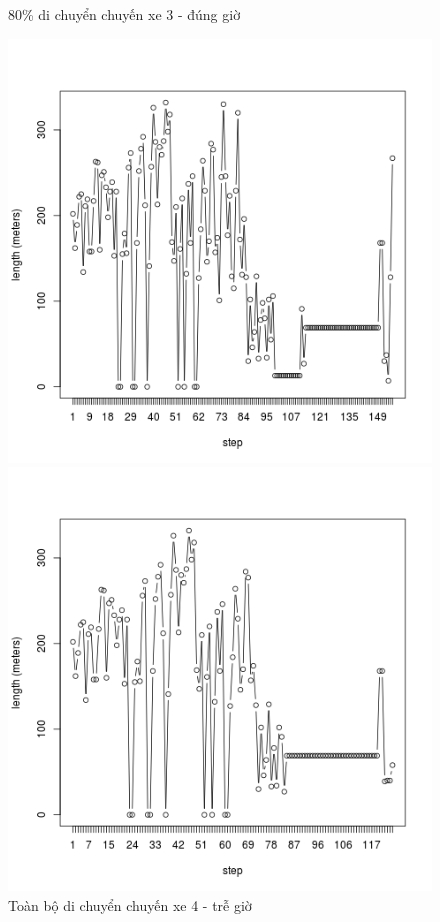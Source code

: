 \documentclass[a4paper, 13pt]{report}
\begin{document}
\begin{figure}[!htb]
  \caption*{80\% di chuyển chuyến xe 3 - đúng giờ}
\endminipage
{}%
  \includegraphics[width=\linewidth]{test_100_4}
  \caption*{Toàn bộ di chuyển chuyến xe 4 - trễ giờ}
\endminipage
{}
  \includegraphics[width=\linewidth]{test_80_4}

\end{figure}
\end{document}

